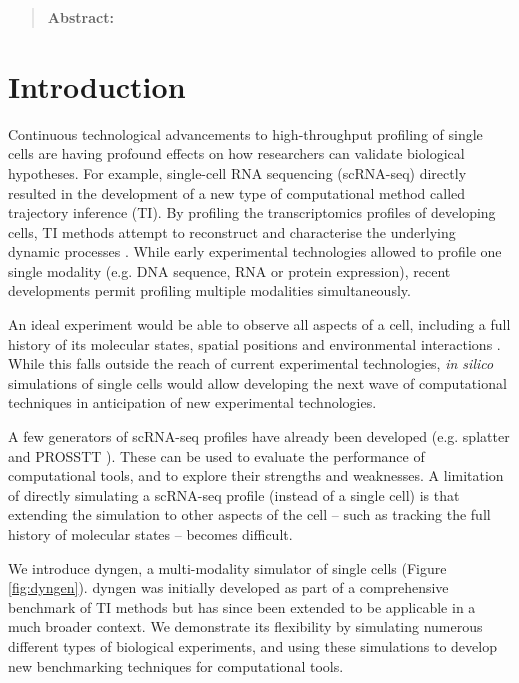 \begin{quote}
	\textbf{Abstract:} 
\end{quote}

\section{Introduction}
Continuous technological advancements to high-throughput profiling of single cells
are having profound effects on how researchers can validate biological hypotheses. 
For example, single-cell RNA sequencing (scRNA-seq) directly resulted in the development
of a new type of computational method called trajectory inference (TI). By profiling
the transcriptomics profiles of developing cells, TI methods attempt to reconstruct 
and characterise the underlying dynamic processes \cite{cannoodt_computationalmethodstrajectory_2016}.
While early experimental technologies allowed to profile one single modality (e.g. DNA sequence, 
RNA or protein expression), recent developments permit profiling multiple modalities simultaneously.

An ideal experiment would be able to observe all aspects of a cell, including a full history of its 
molecular states, spatial positions and environmental interactions \cite{stuart_integrativesinglecellanalysis_2019}. 
While this falls outside the reach of current experimental technologies, \textit{in silico} simulations
of single cells would allow developing the next wave of computational techniques
in anticipation of new experimental technologies.

A few generators of scRNA-seq profiles have already been developed (e.g. splatter \cite{zappia_splattersimulationsinglecell_2017} and PROSSTT \cite{papadopoulos_prossttprobabilisticsimulation_2018}). %
These can be used to evaluate the performance of computational tools, and to explore their strengths and weaknesses. A limitation of directly simulating a scRNA-seq profile (instead of a single cell) is that extending the simulation to other aspects of the cell -- such as tracking the full history of molecular states -- becomes difficult.

We introduce dyngen, a multi-modality simulator of single cells (Figure \ref{fig:dyngen}).
dyngen was initially developed as part of a comprehensive benchmark of TI methods \cite{saelens_comparisonsinglecelltrajectory_2019} but has since been extended to be applicable in a much broader context.
We demonstrate its flexibility by simulating numerous different types of biological experiments, and using these simulations to develop new benchmarking techniques for computational tools.

